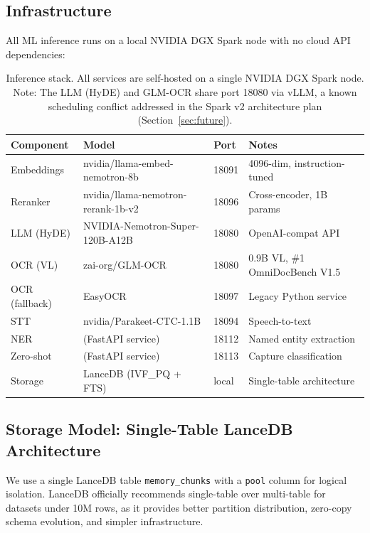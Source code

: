\documentclass[11pt]{article}
\begin{document}
\subsection{Infrastructure}

All ML inference runs on a local NVIDIA DGX Spark node with no cloud API dependencies:

\begin{table}[H]
\centering
\small
\begin{tabular}{llll}
\toprule
\textbf{Component} & \textbf{Model} & \textbf{Port} & \textbf{Notes} \\
\midrule
Embeddings & nvidia/llama-embed-nemotron-8b & 18091 & 4096-dim, instruction-tuned \\
Reranker & nvidia/llama-nemotron-rerank-1b-v2 & 18096 & Cross-encoder, 1B params \\
LLM (HyDE) & NVIDIA-Nemotron-Super-120B-A12B & 18080 & OpenAI-compat API \\
OCR (VL) & zai-org/GLM-OCR & 18080 & 0.9B VL, \#1 OmniDocBench V1.5 \\
OCR (fallback) & EasyOCR & 18097 & Legacy Python service \\
STT & nvidia/Parakeet-CTC-1.1B & 18094 & Speech-to-text \\
NER & (FastAPI service) & 18112 & Named entity extraction \\
Zero-shot & (FastAPI service) & 18113 & Capture classification \\
Storage & LanceDB (IVF\_PQ + FTS) & local & Single-table architecture \\
\bottomrule
\end{tabular}
\caption{Inference stack. All services are self-hosted on a single NVIDIA DGX Spark node.
Note: The LLM (HyDE) and GLM-OCR share port 18080 via vLLM, a known scheduling conflict
addressed in the Spark v2 architecture plan (Section~\ref{sec:future}).}
\label{tab:infra}
\end{table}

\subsection{Storage Model: Single-Table LanceDB Architecture}

We use a single LanceDB table \texttt{memory\_chunks} with a \texttt{pool} column for
logical isolation. LanceDB officially recommends single-table over multi-table for
datasets under 10M rows, as it provides better partition distribution, zero-copy schema
evolution, and simpler infrastructure.
\end{document}
